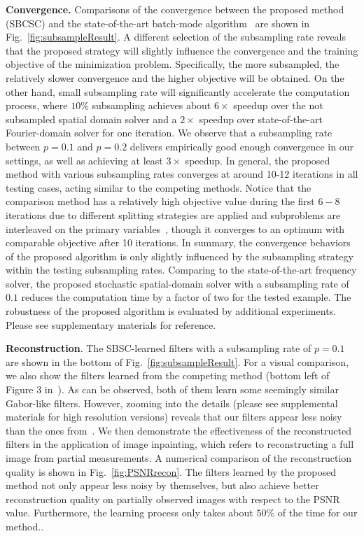 {\bfseries Convergence.} Comparisons of the convergence between the
proposed method (SBCSC) and the state-of-the-art batch-mode
algorithm~\cite{heide2015fast} are shown in
Fig.~\ref{fig:subsampleResult}. A different selection of the
subsampling rate reveals that the proposed strategy will slightly
influence the convergence and the training objective of the
minimization problem. Specifically, the more subsampled, the
relatively slower convergence and the higher objective will be
obtained. On the other hand, small subsampling rate will significantly
accelerate the computation process, where $10\%$ subsampling achieves
about $6 \times$ speedup over the not subsampled spatial domain solver
and a $2 \times$ speedup over state-of-the-art Fourier-domain solver
for one iteration. We observe that a subsampling rate between $p=0.1$
and $p=0.2$ delivers empirically good enough convergence in our
settings, as well as achieving at least $3 \times$ speedup. In
general, the proposed method with various subsampling rates converges
at around 10-12 iterations in all testing cases, acting similar to the
competing methods.
Notice that the comparison method has a relatively
high objective value during the first $6-8$ iterations due to
different splitting strategies are applied and subproblems are
interleaved on the primary variables~\cite{wohlberg2016efficient},
though it converges to an optimum with comparable objective after 10
iterations. In summary, the convergence behaviors of the proposed
algorithm is only slightly influenced by the subsampling strategy
within the testing subsampling rates. Comparing to the
state-of-the-art frequency solver, the proposed stochastic
spatial-domain solver with a subsampling rate of $0.1$ reduces the
computation time by a factor of two for the tested example. The
robustness of the proposed algorithm is evaluated by additional
experiments. Please see supplementary materials for reference.

{\bfseries Reconstruction}. The SBSC-learned filters with a
subsampling rate of $p=0.1$ are shown in the bottom of
Fig.~\ref{fig:subsampleResult}. For a visual comparison, we also show
the filters learned from the competing method (bottom left of Figure 3
in~\cite{heide2015fast}). As can be observed, both of them learn some
seemingly similar Gabor-like filters. However, zooming into the
details (please see supplemental materials for high resolution
versions) reveals that our filters appear less noisy than the ones
from~\cite{heide2015fast}. We then demonstrate the effectiveness of
the reconstructed filters in the application of image inpainting,
which refers to reconstructing a full image from partial
measurements. A numerical comparison of the reconstruction quality is
shown in Fig.~\ref{fig:PSNRrecon}. The filters learned by the proposed
method not only appear less noisy by themselves, but also achieve
better reconstruction quality on partially observed images with
respect to the PSNR value. Furthermore, the learning process
only takes about $50\%$ of the time for our method..

